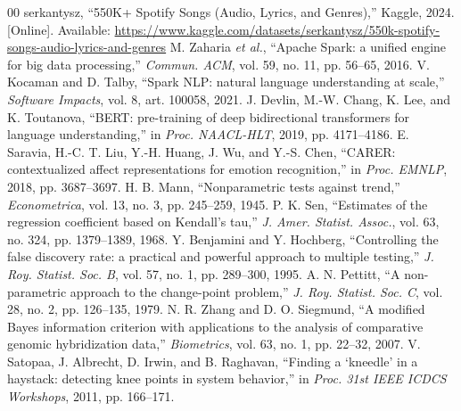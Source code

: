 \documentclass[conference]{IEEEtran}
\begin{document}
\begin{thebibliography}{00}
 serkantysz, ``550K+ Spotify Songs (Audio, Lyrics, and Genres),'' Kaggle, 2024. [Online]. Available: \url{https://www.kaggle.com/datasets/serkantysz/550k-spotify-songs-audio-lyrics-and-genres}
 M. Zaharia \textit{et al.}, ``Apache Spark: a unified engine for big data processing,'' \textit{Commun. ACM}, vol. 59, no. 11, pp. 56--65, 2016.
 V. Kocaman and D. Talby, ``Spark NLP: natural language understanding at scale,'' \textit{Software Impacts}, vol. 8, art. 100058, 2021.
 J. Devlin, M.-W. Chang, K. Lee, and K. Toutanova, ``BERT: pre-training of deep bidirectional transformers for language understanding,'' in \textit{Proc. NAACL-HLT}, 2019, pp. 4171--4186.
 E. Saravia, H.-C. T. Liu, Y.-H. Huang, J. Wu, and Y.-S. Chen, ``CARER: contextualized affect representations for emotion recognition,'' in \textit{Proc. EMNLP}, 2018, pp. 3687--3697.
 H. B. Mann, ``Nonparametric tests against trend,'' \textit{Econometrica}, vol. 13, no. 3, pp. 245--259, 1945.
 P. K. Sen, ``Estimates of the regression coefficient based on Kendall's tau,'' \textit{J. Amer. Statist. Assoc.}, vol. 63, no. 324, pp. 1379--1389, 1968.
 Y. Benjamini and Y. Hochberg, ``Controlling the false discovery rate: a practical and powerful approach to multiple testing,'' \textit{J. Roy. Statist. Soc. B}, vol. 57, no. 1, pp. 289--300, 1995.
 A. N. Pettitt, ``A non-parametric approach to the change-point problem,'' \textit{J. Roy. Statist. Soc. C}, vol. 28, no. 2, pp. 126--135, 1979.
 N. R. Zhang and D. O. Siegmund, ``A modified Bayes information criterion with applications to the analysis of comparative genomic hybridization data,'' \textit{Biometrics}, vol. 63, no. 1, pp. 22--32, 2007.
 V. Satopaa, J. Albrecht, D. Irwin, and B. Raghavan, ``Finding a `kneedle' in a haystack: detecting knee points in system behavior,'' in \textit{Proc. 31st IEEE ICDCS Workshops}, 2011, pp. 166--171.
\end{thebibliography}
\end{document}
